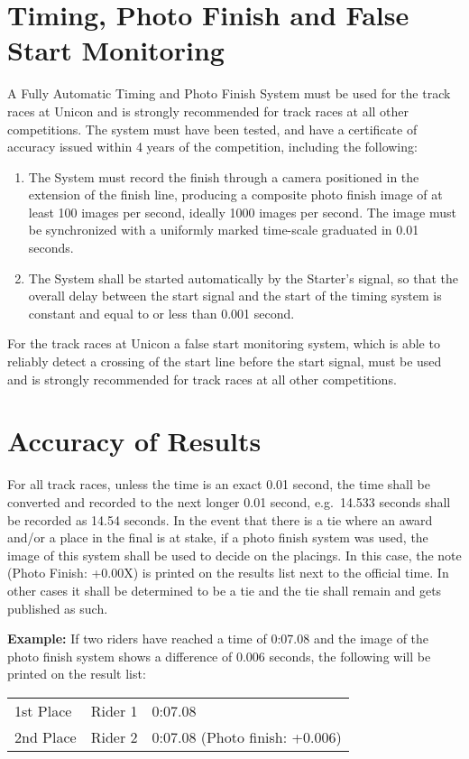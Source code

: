 \section{Timing, Photo Finish and False Start Monitoring}

A Fully Automatic Timing and Photo Finish System must be used for the track races at Unicon and is strongly recommended for track races at all other competitions.
The system must have been tested, and have a certificate of accuracy issued within 4 years of the competition, including the following:
\begin{enumerate}
\item The System must record the finish through a camera positioned in the extension of the finish line, producing a composite photo finish image of at least 100 images per second, ideally 1000 images per second. The image must be synchronized with a uniformly marked time-scale graduated in 0.01 seconds.
\item The System shall be started automatically by the Starter’s signal, so that the overall delay between the start signal and the start of the timing system is constant and equal to or less than 0.001 second.
\end{enumerate}

For the track races at Unicon a false start monitoring system, which is able to reliably detect a crossing of the start line before the start signal, must be used and is strongly recommended for track races at all other competitions.

\section{Accuracy of Results}

For all track races, unless the time is an exact 0.01 second, the time shall be converted and recorded to the next longer 0.01 second, e.g.\ 14.533 seconds shall be recorded as 14.54 seconds.
In the event that there is a tie where an award and/or a place in the final is at stake, if a photo finish system was used, the image of this system shall be used to decide on the placings.
In this case, the note (Photo Finish: +0.00X) is printed on the results list next to the official time. In other cases it shall be determined to be a tie and the tie shall remain and gets published as such.

\textbf{Example:} If two riders have reached a time of 0:07.08 and the image of the photo finish system shows a difference of 0.006 seconds, the following will be printed on the result list:\\
\begin{tabular}{l l l}
1st Place & Rider 1 & 0:07.08 \\
2nd Place & Rider 2 & 0:07.08 (Photo finish: +0.006)\\
\end{tabular}
